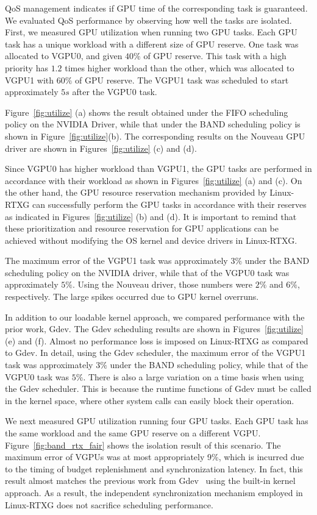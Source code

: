 QoS management indicates if GPU time of the corresponding task is
guaranteed.
We evaluated QoS performance by observing how well the tasks are
isolated.
First, we measured GPU utilization when running two GPU tasks.
Each GPU task has a unique workload with a different size of GPU
reserve.
One task was allocated to VGPU0, and given $40\%$ of GPU reserve.
This task with a high priority has $1.2$ times higher workload than the
other, which was allocated to VGPU1 with $60\%$ of GPU reserve.
The VGPU1 task was scheduled to start approximately $5s$ after the VGPU0
task.

Figure~\ref{fig:utilize} (a) shows the result obtained under the FIFO
scheduling policy on the NVIDIA Driver, while that under the BAND
scheduling policy is shown in Figure~\ref{fig:utilize}(b).
The corresponding results on the Nouveau GPU driver are shown in
Figures~\ref{fig:utilize} (c) and (d).

Since VGPU0 has higher workload than VGPU1, the GPU tasks are performed
in accordance with their workload as shown in Figures~\ref{fig:utilize}
(a) and (c).
On the other hand, the GPU resource reservation mechanism provided by
Linux-RTXG can successfully perform the GPU tasks in accordance with
their reserves as indicated in Figures~\ref{fig:utilize} (b) and (d).
It is important to remind that these prioritization and resource
reservation for GPU applications can be achieved without modifying the
OS kernel and device drivers in Linux-RTXG.

The maximum error of the VGPU1 task was approximately $3\%$ under the
BAND scheduling policy on the NVIDIA driver, while that of the VGPU0
task was approximately $5\%$.
Using the Nouveau driver, those numbers were $2\%$ and $6\%$,
respectively.
The large spikes occurred due to GPU kernel overruns.

In addition to our loadable kernel approach, we compared performance
with the prior work, Gdev.
The Gdev scheduling results are shown in Figures~\ref{fig:utilize} (e)
and (f).
Almost no performance loss is imposed on Linux-RTXG as compared to
Gdev.
In detail, using the Gdev scheduler, the maximum error of the VGPU1 task
was approximately $3\%$ under the BAND scheduling policy, while that of
the VGPU0 task was $5\%$.
There is also a large variation on a time basis when using the Gdev
scheduler.
This is because the runtime functions of Gdev must be called in the
kernel space, where other system calls can easily block their operation.

We next measured GPU utilization running four GPU tasks.
Each GPU task has the same workload and the same GPU reserve on a
different VGPU.
Figure~\ref{fig:band_rtx_fair} shows the isolation result of this
scenario.
The maximum error of VGPUs was at most appropriately 9\%, which is
incurred due to the timing of budget replenishment and synchronization
latency.
In fact, this result almost matches the previous work from
Gdev~\cite{kato:gdev} using the built-in kernel approach.
As a result, the independent synchronization mechanism employed in
Linux-RTXG does not sacrifice scheduling performance.

